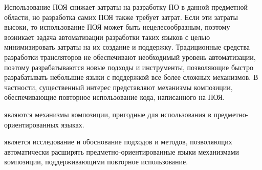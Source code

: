 Использование ПОЯ снижает затраты на разработку ПО в данной предметной области, но разработка самих ПОЯ также требует затрат. Если эти затраты высоки, то использование ПОЯ может быть нецелесообразным, поэтому возникает задача автоматизации разработки таких языков с целью минимизировать затраты на их создание и поддержку. Традиционные средства разработки трансляторов не обеспечивают необходимый уровень автоматизации, поэтому разрабатываются новые подходы и инструменты, позволяющие быстро разрабатывать небольшие языки с поддержкой все более сложных механизмов. В частности, существенный интерес представляют механизмы композиции, обеспечивающие повторное использование кода, написанного на ПОЯ. %

 являются механизмы композиции, пригодные для использования в предметно-ориентированных языках.

 является исследование и обоснование подходов и методов, позволяющих автоматически расширять предметно-ориентированные языки механизмами композиции, поддерживающими повторное использование.

